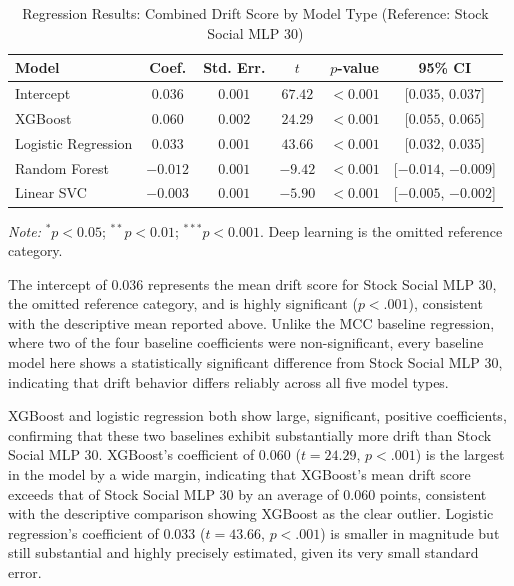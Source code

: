 \documentclass[stu,floatsintext]{apa7}
\begin{document}
\begin{table}[htbp]
\centering
\caption{Regression Results: Combined Drift Score by Model Type (Reference: Stock Social MLP 30)}
\label{tab:drift_baseline_regression}
\begin{tabular}{lccccc}
\toprule
Model & Coef. & Std. Err. & $t$ & $p$-value & 95\% CI \\
\midrule
Intercept              & $0.036$  & $0.001$ & $67.42$  & $<0.001$\rlap{$^{***}$} & [$0.035$, $0.037$] \\
XGBoost                 & $0.060$  & $0.002$ & $24.29$  & $<0.001$\rlap{$^{***}$} & [$0.055$, $0.065$] \\
Logistic Regression      & $0.033$  & $0.001$ & $43.66$  & $<0.001$\rlap{$^{***}$} & [$0.032$, $0.035$] \\
Random Forest            & $-0.012$ & $0.001$ & $-9.42$  & $<0.001$\rlap{$^{***}$} & [$-0.014$, $-0.009$] \\
Linear SVC               & $-0.003$ & $0.001$ & $-5.90$  & $<0.001$\rlap{$^{***}$} & [$-0.005$, $-0.002$] \\
\bottomrule
\end{tabular}
\begin{flushleft}
\footnotesize
\textit{Note:} $^{*}p<0.05$; $^{**}p<0.01$; $^{***}p<0.001$. Deep learning is the omitted reference category.
\end{flushleft}
\end{table}

The intercept of 0.036 represents the mean drift score for Stock Social MLP 30, the omitted reference category, and is highly significant ($p < .001$), consistent with the descriptive mean reported above. Unlike the MCC baseline regression, where two of the four baseline coefficients were non-significant, every baseline model here shows a statistically significant difference from Stock Social MLP 30, indicating that drift behavior differs reliably across all five model types.

XGBoost and logistic regression both show large, significant, positive coefficients, confirming that these two baselines exhibit substantially more drift than Stock Social MLP 30. XGBoost's coefficient of 0.060 ($t = 24.29$, $p < .001$) is the largest in the model by a wide margin, indicating that XGBoost's mean drift score exceeds that of Stock Social MLP 30 by an average of 0.060 points, consistent with the descriptive comparison showing XGBoost as the clear outlier. Logistic regression's coefficient of 0.033 ($t = 43.66$, $p < .001$) is smaller in magnitude but still substantial and highly precisely estimated, given its very small standard error.
\end{document}

